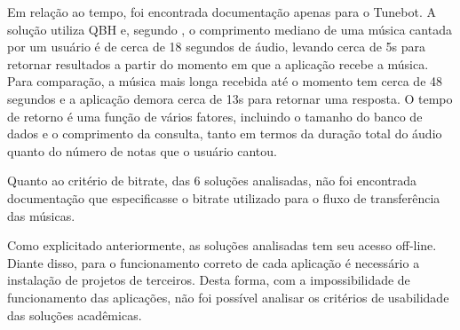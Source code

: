 Em relação ao tempo, foi encontrada documentação apenas para o Tunebot. A solução utiliza QBH e, segundo , o comprimento mediano de uma música cantada por um usuário é de cerca de 18 segundos de áudio, levando cerca de 5s para retornar resultados a partir do momento em que a aplicação recebe a música. Para comparação, a música mais longa recebida até o momento tem cerca de 48 segundos e a aplicação demora cerca de 13s para retornar uma resposta. O tempo de retorno é uma função de vários fatores, incluindo o tamanho do banco de dados e o comprimento da consulta, tanto em termos da duração total do áudio quanto do número de notas que o usuário cantou.

Quanto ao critério de bitrate, das 6 soluções analisadas, não foi encontrada documentação que especificasse o bitrate utilizado para o fluxo de transferência das músicas.

Como explicitado anteriormente, as soluções analisadas tem seu acesso off-line. Diante disso, para o funcionamento correto de cada aplicação é necessário a instalação de projetos de terceiros. Desta forma, com a impossibilidade de funcionamento das aplicações, não foi possível analisar os critérios de usabilidade das soluções acadêmicas.

